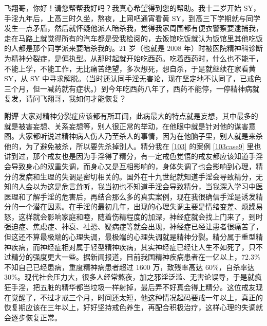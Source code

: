 \begin{case}
    飞翔哥，你好！请您帮帮我好吗？我真心希望得到您的帮助。我十二岁开始 SY，手淫九年后，上高三时久坐，熬夜，上网吧通宵看黄 SY，到高三下学期就与同学发生一点矛盾，然后就怀疑他派人暗杀我，觉得我家周围都有便衣警察要逮捕我，走在马路上就觉得所有的汽车都是受我检阅的，去饭馆吃饭就认为饭馆里其他吃饭的人都是那个同学派来要暗杀我的。21 岁（也就是 2008 年）时被医院精神科诊断为精神分裂症，是偏执型。从那时起就开始吃西药。吃着西药时，什么也不能干，不能上学，不能工作，无比痛苦绝望，多次想死，想自杀，于是就继续在家看黄 SY，从 SY 中寻求解脱。（当时还认同手淫无害论，现在坚定地不认同了，已戒色三个月，但一减药就有症状。）到今年吃西药八年了，西药不能停，一停精神病就复发，请问飞翔哥，我如何才能恢复？

    \textbf{附评} 大家对精神分裂症应该都有所耳闻，此病最大的特点就是妄想，其中最多的就是被害妄想、关系妄想等，别人很正常的举动，在他眼中就是针对他的谋害意图。大家都听说过精神病人伤人乃至杀人的事情，因为在他脑子里，别人就是来杀他的，为了避免被杀，所以要先杀掉别人。精分我在 \ref{103} 的案例 \ref{103case9} 里也讲到过，那个戒友也是因为手淫得了精分，有一定戒色觉悟的戒友都应该知道手淫会导致身心的双重失调，而身心又是互相影响的，身体失调了也会影响到心理，精分的发病和生理的失调是密切相关的。国外在十九世纪就知道手淫会导致精分，无知的人会以为这是危言耸听，我当初也不知道手淫会导致精分，当我深入学习中医医理和了解手淫的危害后，再结合那么多的真实案例，现在我很确信手淫是诱发精分的一个潜在因素。在手淫的最初几年，出现的心理失调主要是情绪变差、烦躁易怒，这样就会影响家庭和睦，随着伤精程度的加深，神经症就会找上门来了，到时强迫症、焦虑症、神衰、社恐、疑病症等就会出现，神经症已经让患者很痛苦了，但这还不算最极端的心理失调，最极端的心理失调就是精神分裂。精分属于重型精神疾病，而神经症相对属于轻型精神疾病，其实神经症已经让人生不如死了，只不过精分的强度更大一些。据新闻报道，目前我国精神疾病患者在一亿以上，72.3\% 不知自己已经患病，重度精神病患者超过 1600 万，致残率高达 60\%，自杀率达 30\%。现代社会压力大，很多人经常熬夜，加之邪淫泛滥、无害论误导，于是就疯狂手淫，把五脏的精华都当垃圾一样射掉，最后弄不好真会得上精分。这位戒友现在觉醒了，不过才戒三个月，时间还太短，他这种情况起码要戒一年以上，真正的恢复期应该在三年以上，好好坚持戒色养生，再配合积极治疗，这样心理的失调就会逐步恢复正常。
\end{case}

